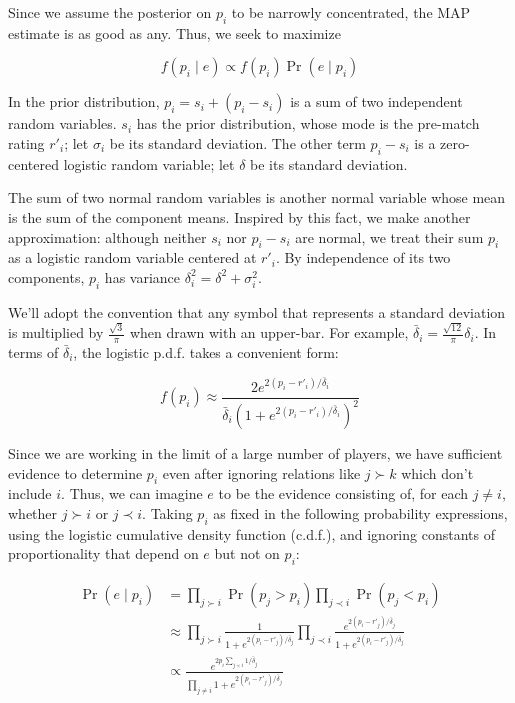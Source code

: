 \documentclass{article}
\begin{document}
Since we assume the posterior on $p_i$ to be narrowly concentrated, the MAP estimate is as good as any. Thus, we seek to maximize

\[f(p_i\mid e) \propto f(p_i) \Pr(e\mid p_i)\]

In the prior distribution, $p_i = s_i + (p_i-s_i)$ is a sum of two independent random variables. $s_i$ has the prior distribution, whose mode is the pre-match rating $r'_i$; let $\sigma_i$ be its standard deviation. The other term $p_i-s_i$ is a zero-centered logistic random variable; let $\delta$ be its standard deviation.

The sum of two normal random variables is another normal variable whose mean is the sum of the component means. Inspired by this fact, we make another approximation: although neither $s_i$ nor $p_i-s_i$ are normal, we treat their sum $p_i$ as a logistic random variable centered at $r'_i$. By independence of its two components, $p_i$ has variance $\delta_i^2 = \delta^2 + \sigma_i^2$.

We'll adopt the convention that any symbol that represents a standard deviation is multiplied by $\frac{\sqrt{3}}{\pi}$ when drawn with an upper-bar. For example, $\bar\delta_i = \frac{\sqrt{12}}{\pi} \delta_i$. In terms of $\bar\delta_i$, the logistic p.d.f. takes a convenient form:

\[f(p_i) \approx \frac { 2e^{2(p_i-r'_i)/\bar\delta_i} } { \bar\delta_i\left(1 + e^{2(p_i-r'_i)/\bar\delta_i} \right)^2}\]

Since we are working in the limit of a large number of players, we have sufficient evidence to determine $p_i$ even after ignoring relations like $j \succ k$ which don't include $i$. Thus, we can imagine $e$ to be the evidence consisting of, for each $j\ne i$, whether $j \succ i$ or $j \prec i$. Taking $p_i$ as fixed in the following probability expressions, using the logistic cumulative density function (c.d.f.), and ignoring constants of proportionality that depend on $e$ but not on $p_i$:

\begin{align*}
\Pr(e\mid p_i)
&= \prod_{j \succ i} \Pr(p_j > p_i) \prod_{j \prec i} \Pr(p_j < p_i)
\\&\approx \prod_{j \succ i} \frac {1} {1 + e^{2(p_i-r'_j)/\bar\delta_j}} \prod_{j \prec i} \frac {e^{2(p_i-r'_j)/\bar\delta_j}} {1 + e^{2(p_i-r'_j)/\bar\delta_j}}
\\&\propto \frac {e^{2p_i\sum_{j\prec i}1/\bar\delta_j}} {\prod_{j\neq i} 1 + e^{2(p_i-r'_j)/\bar\delta_j}}
\end{align*}
\end{document}
